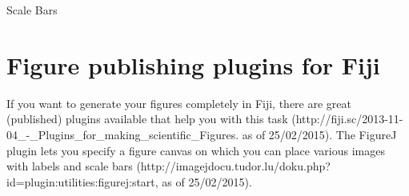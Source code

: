 \begin{taskbox}{Scale Bars}
\begin{enumerate}
	\begin{minipage}[t]{\linewidth}
		\begin{center}
		\medskip
		\label{fig:scale-bar-dialog}
		\end{center}
	\end{minipage}
	
\end{enumerate}

\end{taskbox}

\section{Figure publishing plugins for Fiji}
If you want to generate your figures completely in Fiji, there are great (published) plugins available that help you with this task (http://fiji.sc/2013-11-04\_-\_Plugins\_for\_making\_scientific\_Figures. as of 25/02/2015). The FigureJ plugin lets you specify a figure canvas on which you can place various images with labels and scale bars (http://imagejdocu.tudor.lu/doku.php?id=plugin:utilities:figurej:start, as of 25/02/2015).

